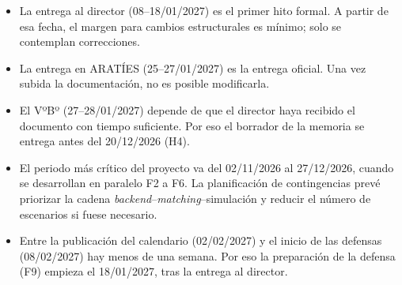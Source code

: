 \begin{itemize}
    \item La entrega al director (08--18/01/2027) es el primer hito formal. A partir de esa fecha, el margen para cambios estructurales es mínimo; solo se contemplan correcciones.
    \item La entrega en ARATÍES (25--27/01/2027) es la entrega oficial. Una vez subida la documentación, no es posible modificarla.
    \item El VºBº (27--28/01/2027) depende de que el director haya recibido el documento con tiempo suficiente. Por eso el borrador de la memoria se entrega antes del 20/12/2026 (H4).
    \item El periodo más crítico del proyecto va del 02/11/2026 al 27/12/2026, cuando se desarrollan en paralelo F2 a F6. La planificación de contingencias prevé priorizar la cadena \textit{backend}--\textit{matching}--simulación y reducir el número de escenarios si fuese necesario.
    \item Entre la publicación del calendario (02/02/2027) y el inicio de las defensas (08/02/2027) hay menos de una semana. Por eso la preparación de la defensa (F9) empieza el 18/01/2027, tras la entrega al director.
\end{itemize}
